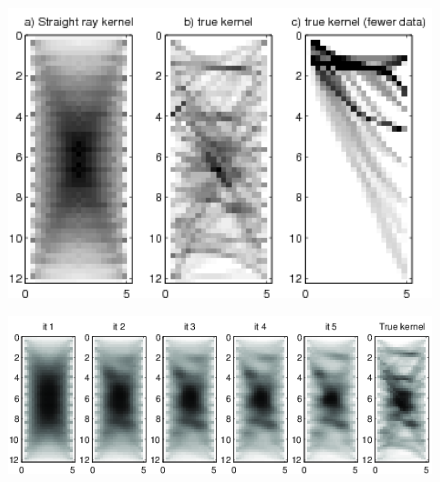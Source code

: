 \documentclass[12t]{article}
\begin{document}
\begin{figure}
\centering
  \includegraphics[width=14cm]{true_nonlin_kernel_color}
\caption[Linear averaging kernels using a) a constant velocity field,  b) the true velocity field, and c) as a) but only for 12 propagating wavefields. White indicate low sensitivity (ie. little weight in the averaging kernel) and black high sensitivity.]{}
\label{fig:true_nonlin_kernel}
\end{figure}




\begin{figure}
\centering
  \includegraphics[width=14cm]{iterative_kernel_f2_color}
\caption[The evolution of the kernels sensitivity density in 5 iterative steps. right) the true kernel for comparison. Black reflects high and white low sensitivity]{}
\label{fig:iterative_kernel}
\end{figure}
\end{document}
